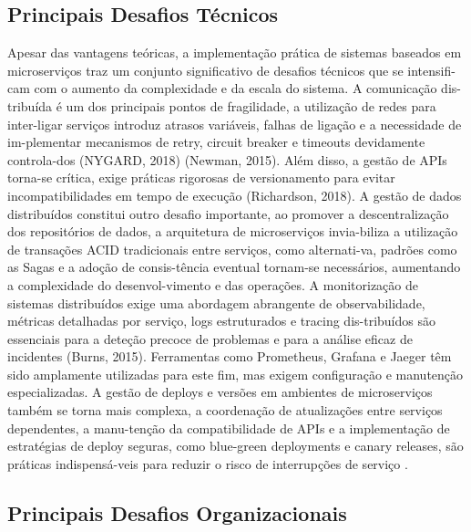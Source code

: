 \subsection{Principais Desafios Técnicos}

Apesar das vantagens teóricas, a implementação prática de sistemas baseados em microserviços traz um conjunto significativo de desafios técnicos que se intensifi-cam com o aumento da complexidade e da escala do sistema. A comunicação dis-tribuída é um dos principais pontos de fragilidade, a utilização de redes para inter-ligar serviços introduz atrasos variáveis, falhas de ligação e a necessidade de im-plementar mecanismos de retry, circuit breaker e timeouts devidamente controla-dos (NYGARD, 2018) (Newman, 2015). Além disso, a gestão de APIs torna-se crítica, exige práticas rigorosas de versionamento para evitar incompatibilidades em tempo de execução (Richardson, 2018).
A gestão de dados distribuídos constitui outro desafio importante, ao promover a descentralização dos repositórios de dados, a arquitetura de microserviços invia-biliza a utilização de transações ACID tradicionais entre serviços, como alternati-va, padrões como as Sagas \cite{Garcia-Molina1987} e a adoção de consis-tência eventual tornam-se necessários, aumentando a complexidade do desenvol-vimento e das operações.
A monitorização de sistemas distribuídos exige uma abordagem abrangente de observabilidade, métricas detalhadas por serviço, logs estruturados e tracing dis-tribuídos são essenciais para a deteção precoce de problemas e para a análise eficaz de incidentes (Burns, 2015). Ferramentas como Prometheus, Grafana e Jaeger têm sido amplamente utilizadas para este fim, mas exigem configuração e manutenção especializadas.
A gestão de deploys e versões em ambientes de microserviços também se torna mais complexa, a coordenação de atualizações entre serviços dependentes, a manu-tenção da compatibilidade de APIs e a implementação de estratégias de deploy seguras, como blue-green deployments e canary releases, são práticas indispensá-veis para reduzir o risco de interrupções de serviço \cite{Humble2010}.

\subsection{Principais Desafios Organizacionais}


